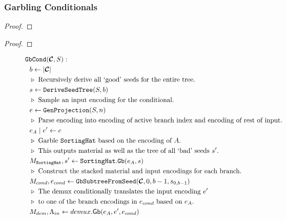 \subsubsection{Garbling Conditionals}

\begin{lemma}\label{lemma:gbcondtime}
\end{lemma}
\begin{proof}
\end{proof}

\begin{lemma}\label{lemma:gbcondspace}
\end{lemma}
\begin{proof}
\end{proof}

\begin{figure}[t]
  \begin{align*}
    &\gbcond(\vec{\cir}, S):\\
    &~~b \gets | \vec{\cir} |\\
    &~~\codecomment{Recursively derive all `good' seeds for the entire tree.}\\
    &~~s \gets \mathtt{DeriveSeedTree}(S, b)\\
    &~~\codecomment{Sample an input encoding for the conditional.}\\
    &~~e \gets \genprojection(S, n)\\
    &~~\codecomment{Parse encoding into encoding of active branch
    index and encoding of rest of input.}\\
    &~~e_\aid\mid e' \gets e\\
    &~~\codecomment{Garble \gadget\ based on the encoding of \aid.}\\
    &~~\codecomment{This outputs material as well as the tree of all
    `bad' seeds $s'$.}\\
    &~~\mat_\gadget, s' \gets \gadget.\mathtt{Gb}(e_\aid, s)\\
    &~~\codecomment{Construct the stacked material and input encodings for each branch.}\\
    &~~M_{cond}, e_{cond} \gets \gbtree(\vec{\cir}, 0, b-1, s_{0, b-1})\\
    &~~\codecomment{The demux conditionally translates the input encoding $e'$}\\ 
    &~~\codecomment{to one of the branch encodings in $e_{cond}$ based on $e_\aid$.}\\
    &~~\mat_{dem}, \Lambda_{in} \gets \gbdem(e_\aid, e', e_{cond})\\

\end{align*}
\end{figure}
